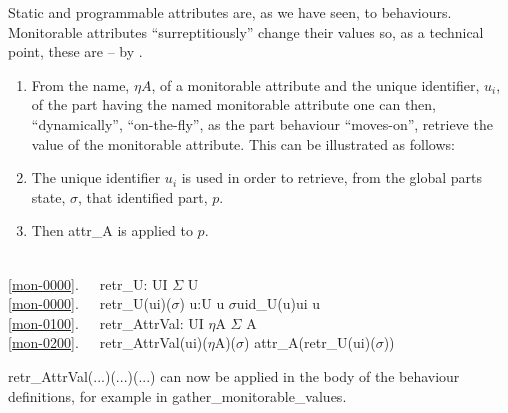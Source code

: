 
\begynd
\pind Static and programmable attributes are, as we have seen, \nyl
       to behaviours.
\pind Monitorable attributes ``surreptitiously'' change their values \nyl
      so, as a technical point, these are  --
\pind by . 
\afslut

\begin{enumerate}\setei
\item \label{mon-0000} From the name, $\eta{A}$, of a monitorable attribute and
  \nyl the unique identifier, $u_i$,  of the part having the named monitorable
  attribute \nyl one can then, ``dynamically'', ``on-the-fly'', \nyl
  as the part behaviour ``moves-on'', retrieve the value of the
  monitorable attribute.  This can be illustrated as follows:
\item \label{mon-0100} The unique identifier $u_i$ is used in order to
  retrieve, from the global parts state, $\sigma$, that identified
  part, $p$.  
\item \label{mon-0200} Then \textsf{attr\_A} is applied to $p$.
\savei\end{enumerate}
\mnewfoil

\bp
{} \\
\ref{mon-0000}.\ \ \ retr\_U: UI {\RIGHTARROW} $\Sigma$ {\RIGHTARROW} U\\
\ref{mon-0000}.\ \ \ retr\_U(ui)($\sigma$) {\IS}  u:U {\RDOT} u {\ISIN} $\sigma${\WEDGE}uid\_U(u){\EQ}ui  u \\
\ref{mon-0100}.\ \ \ retr\_AttrVal: UI {\TIMES} $\eta$A {\RIGHTARROW} $\Sigma$ {\RIGHTARROW} A\\
\ref{mon-0200}.\ \ \ retr\_AttrVal(ui)($\eta$A)($\sigma$) {\IS} attr\_A(retr\_U(ui)($\sigma$))\ \ \ 
\ep

\noindent
\begynd
\pind \textsf{retr\_AttrVal(...)(...)(...)} can now be applied in the 
      body of the behaviour definitions, for example in
      \textsf{gather\_monitorable\_values}. 
\afslut

